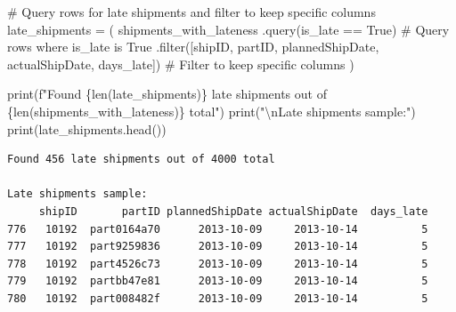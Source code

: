 \documentclass[
  letterpaper,
  DIV=11,
  numbers=noendperiod]{scrartcl}
\newenvironment{Shaded}{\begin{snugshade}}{\end{snugshade}}
\newcommand{\BuiltInTok}[1]{\textcolor[rgb]{0.00,0.23,0.31}{#1}}
\newcommand{\CharTok}[1]{\textcolor[rgb]{0.13,0.47,0.30}{#1}}
\newcommand{\CommentTok}[1]{\textcolor[rgb]{0.37,0.37,0.37}{#1}}
\newcommand{\NormalTok}[1]{\textcolor[rgb]{0.00,0.23,0.31}{#1}}
\newcommand{\OperatorTok}[1]{\textcolor[rgb]{0.37,0.37,0.37}{#1}}
\newcommand{\SpecialCharTok}[1]{\textcolor[rgb]{0.37,0.37,0.37}{#1}}
\newcommand{\SpecialStringTok}[1]{\textcolor[rgb]{0.13,0.47,0.30}{#1}}
\newcommand{\StringTok}[1]{\textcolor[rgb]{0.13,0.47,0.30}{#1}}
\begin{document}
\label{mental-model-2-subset}
\begin{Shaded}
\begin{Highlighting}[]
\CommentTok{\# Query rows for late shipments and filter to keep specific columns}
\NormalTok{late\_shipments }\OperatorTok{=}\NormalTok{ (}
\NormalTok{    shipments\_with\_lateness}
\NormalTok{    .query(}\StringTok{\textquotesingle{}is\_late == True\textquotesingle{}}\NormalTok{)  }\CommentTok{\# Query rows where is\_late is True}
\NormalTok{    .}\BuiltInTok{filter}\NormalTok{([}\StringTok{\textquotesingle{}shipID\textquotesingle{}}\NormalTok{, }\StringTok{\textquotesingle{}partID\textquotesingle{}}\NormalTok{, }\StringTok{\textquotesingle{}plannedShipDate\textquotesingle{}}\NormalTok{, }\StringTok{\textquotesingle{}actualShipDate\textquotesingle{}}\NormalTok{, }\StringTok{\textquotesingle{}days\_late\textquotesingle{}}\NormalTok{])  }\CommentTok{\# Filter to keep specific columns}
\NormalTok{)}

\BuiltInTok{print}\NormalTok{(}\SpecialStringTok{f"Found }\SpecialCharTok{\{}\BuiltInTok{len}\NormalTok{(late\_shipments)}\SpecialCharTok{\}}\SpecialStringTok{ late shipments out of }\SpecialCharTok{\{}\BuiltInTok{len}\NormalTok{(shipments\_with\_lateness)}\SpecialCharTok{\}}\SpecialStringTok{ total"}\NormalTok{)}
\BuiltInTok{print}\NormalTok{(}\StringTok{"}\CharTok{\textbackslash{}n}\StringTok{Late shipments sample:"}\NormalTok{)}
\BuiltInTok{print}\NormalTok{(late\_shipments.head())}
\end{Highlighting}
\end{Shaded}

\begin{verbatim}
Found 456 late shipments out of 4000 total

Late shipments sample:
     shipID       partID plannedShipDate actualShipDate  days_late
776   10192  part0164a70      2013-10-09     2013-10-14          5
777   10192  part9259836      2013-10-09     2013-10-14          5
778   10192  part4526c73      2013-10-09     2013-10-14          5
779   10192  partbb47e81      2013-10-09     2013-10-14          5
780   10192  part008482f      2013-10-09     2013-10-14          5
\end{verbatim}
\end{document}
